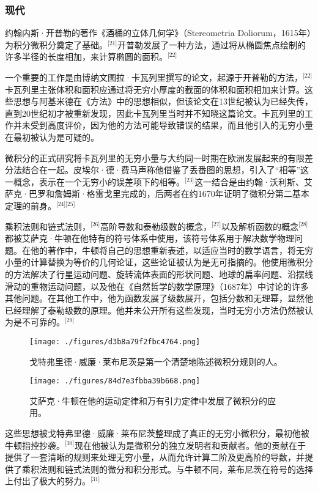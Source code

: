 \subsubsection{现代} 
约翰内斯·开普勒的著作《酒桶的立体几何学》（Stereometria Doliorum，1615年）为积分微积分奠定了基础。\(^\text{[21]}\)开普勒发展了一种方法，通过将从椭圆焦点绘制的许多半径的长度相加，来计算椭圆的面积。\(^\text{[22]}\)

一个重要的工作是由博纳文图拉·卡瓦列里撰写的论文，起源于开普勒的方法，\(^\text{[22]}\)卡瓦列里主张体积和面积应通过将无穷小厚度的截面的体积和面积相加来计算。这些思想与阿基米德在《方法》中的思想相似，但该论文在13世纪被认为已经失传，直到20世纪初才被重新发现，因此卡瓦列里当时并不知晓这篇论文。卡瓦列里的工作并未受到高度评价，因为他的方法可能导致错误的结果，而且他引入的无穷小量在最初被认为是可疑的。

微积分的正式研究将卡瓦列里的无穷小量与大约同一时期在欧洲发展起来的有限差分法结合在一起。皮埃尔·德·费马声称他借鉴了丢番图的思想，引入了“相等”这一概念，表示在一个无穷小的误差项下的相等。\(^\text{[23]}\)这一结合是由约翰·沃利斯、艾萨克·巴罗和詹姆斯·格雷戈里完成的，后两者在约1670年证明了微积分第二基本定理的前身。\(^\text{[24][25]}\)

乘积法则和链式法则，\(^\text{[26]}\)高阶导数和泰勒级数的概念，\(^\text{[27]}\)以及解析函数的概念\(^\text{[28]}\)都被艾萨克·牛顿在他特有的符号体系中使用，该符号体系用于解决数学物理问题。在他的著作中，牛顿将自己的思想重新表述，以适应当时的数学语言，将无穷小量的计算替换为等价的几何论证，这些论证被认为是无可指摘的。他使用微积分的方法解决了行星运动问题、旋转流体表面的形状问题、地球的扁率问题、沿摆线滑动的重物运动问题，以及他在《自然哲学的数学原理》（1687年）中讨论的许多其他问题。在其他工作中，他为函数发展了级数展开，包括分数和无理幂，显然他已经理解了泰勒级数的原理。他并未公开所有这些发现，当时无穷小方法仍然被认为是不可靠的。\(^\text{[29]}\)
\begin{figure}[ht]
\centering
\texttt{[image: ./figures/d3b8a79f2fbc4764.png]}
\caption{戈特弗里德·威廉·莱布尼茨是第一个清楚地陈述微积分规则的人。} \label{fig_Calcul_4}
\end{figure}
\begin{figure}[ht]
\centering
\texttt{[image: ./figures/84d7e3fbba39b668.png]}
\caption{艾萨克·牛顿在他的运动定律和万有引力定律中发展了微积分的应用。} \label{fig_Calcul_5}
\end{figure}
这些思想被戈特弗里德·威廉·莱布尼茨整理成了真正的无穷小微积分，最初他被牛顿指控抄袭。\(^\text{[30]}\)现在他被认为是微积分的独立发明者和贡献者。他的贡献在于提供了一套清晰的规则来处理无穷小量，从而允许计算二阶及更高阶的导数，并提供了乘积法则和链式法则的微分和积分形式。与牛顿不同，莱布尼茨在符号的选择上付出了极大的努力。\(^\text{[31]}\)

